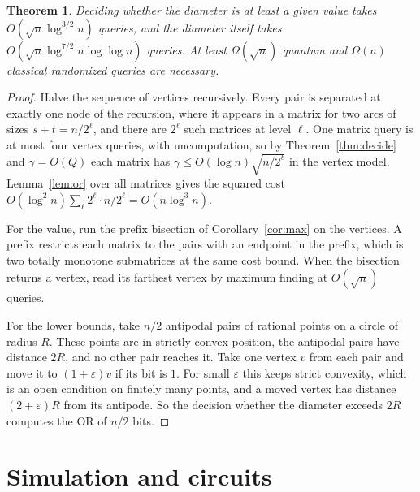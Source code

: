 \documentclass[11pt]{article}
\newtheorem{theorem}{Theorem}[section]
\theoremstyle{definition}
\theoremstyle{remark}
\begin{document}
\begin{theorem}\label{thm:polygon}
Deciding whether the diameter is at least a given value takes $O(\sqrt n\log^{3/2}n)$ queries, and the diameter itself takes $O(\sqrt n\log^{7/2}n\log\log n)$ queries. At least $\Omega(\sqrt n)$ quantum and $\Omega(n)$ classical randomized queries are necessary.
\end{theorem}
\begin{proof}
Halve the sequence of vertices recursively. Every pair is separated at exactly one node of the recursion, where it appears in a matrix for two arcs of sizes $s+t=n/2^\ell$, and there are $2^\ell$ such matrices at level $\ell$. One matrix query is at most four vertex queries, with uncomputation, so by Theorem~\ref{thm:decide} and $\gamma=O(Q)$ each matrix has $\gamma\le O(\log n)\sqrt{n/2^\ell}$ in the vertex model. Lemma~\ref{lem:or} over all matrices gives the squared cost $O(\log^2 n)\sum_\ell 2^\ell\cdot n/2^\ell=O(n\log^3 n)$.

For the value, run the prefix bisection of Corollary~\ref{cor:max} on the vertices. A prefix restricts each matrix to the pairs with an endpoint in the prefix, which is two totally monotone submatrices at the same cost bound. When the bisection returns a vertex, read its farthest vertex by maximum finding at $O(\sqrt n)$ queries.

For the lower bounds, take $n/2$ antipodal pairs of rational points on a circle of radius $R$. These points are in strictly convex position, the antipodal pairs have distance $2R$, and no other pair reaches it. Take one vertex $v$ from each pair and move it to $(1+\varepsilon)v$ if its bit is $1$. For small $\varepsilon$ this keeps strict convexity, which is an open condition on finitely many points, and a moved vertex has distance $(2+\varepsilon)R$ from its antipode. So the decision whether the diameter exceeds $2R$ computes the OR of $n/2$ bits.
\end{proof}

\section{Simulation and circuits}\label{sec:sim}
\end{document}
